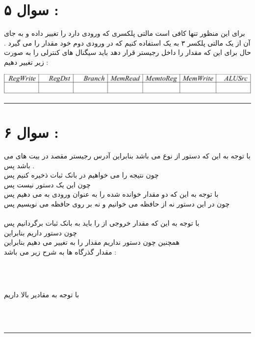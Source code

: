 \section*{سوال ۵ : }
برای این منظور تنها کافی است مالتی پلکسری که ورودی 
دارد را تغییر داده و به جای آن از یک مالتی پلکسر ۳ به یک استفاده کنیم که در ورودی دوم خود مقدار 
را می گیرد . حال برای این که مقدار 
را داخل رجیستر 
قرار دهد باید سیگنال های کنترلی را به صورت زیر تغییر دهیم  : 
\begin{center}
	\includegraphics[width=1\textwidth]{beq}
\end{center}
\hrule
\section*{سوال ۶  : }
با توجه به این که دستور از نوع 
می باشد بنابراین آدرس رجیستر مقصد در بیت های 
\lr{[15-11]}
می باشد پس 
\lr{\textcolor{red}{RegDst = 1}} . 
\\
چون نتیجه را می خواهیم در بانک ثبات ذخیره کنیم پس 
\lr{\textcolor{red}{RegWrite = 1}}
\\
چون این یک دستور 
نیست پس 
\lr{\textcolor{red}{Branch = 0}}
\\
با توجه به این که دو مقدار خوانده شده را به عنوان ورودی به 
می دهیم پس 
\lr{\textcolor{red}{ALUSrc = 0}}
\\
چون در این دستور نه از حافظه می خوانیم و نه بر روی حافظه می نویسیم پس  
\\ 
\lr{\textcolor{red}{MemRead = 0 , MemWrite = 0}}
\\
با توجه به این که مقدار خروجی از 
را باید به بانک ثبات برگردانیم پس 
\lr{\textcolor{red}{MemtoReg = 0 }}
\\
چون دستور 
داریم بنابراین 
\lr{\textcolor{red}{ALUOp  = 01 (ADD)}}
\\
همچنین چون دستور 
نداریم مقدار 
را به 
تغییر می دهیم بنابراین 
\lr{\textcolor{red}{PC = 0x0016}}
\\
مقدار گذرگاه ها به شرح زیر می باشد  : 
\begin{center}
	\\
	\\
\end{center}
با توجه به مقادیر بالا داریم 
\begin{center}
	\\
	\\
\end{center}
\hrule
